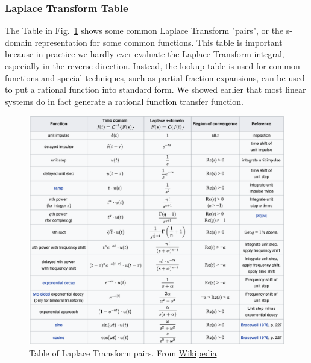 \subsubsection{Laplace Transform Table}
The Table in Fig.~\ref{fig:laplace_xform} shows some common Laplace Transform "pairs", or the s-domain representation for some common functions.   This table is important because in practice we hardly ever evaluate the Laplace Transform integral, especially in the reverse direction.  Instead, the lookup table is used for common functions and special techniques, such as partial fraction expansions, can be used to put a rational function into standard form.  We showed earlier that most linear systems do in fact generate a rational function transfer function.  
\begin{figure}[tb]
\centering
\includegraphics[width=\columnwidth]{laplace_transform.png}
\caption{Table of Laplace Transform pairs.  From \href{https://en.wikipedia.org/wiki/Laplace_transform}{Wikipedia}}
\label{fig:laplace_xform}
\end{figure}
